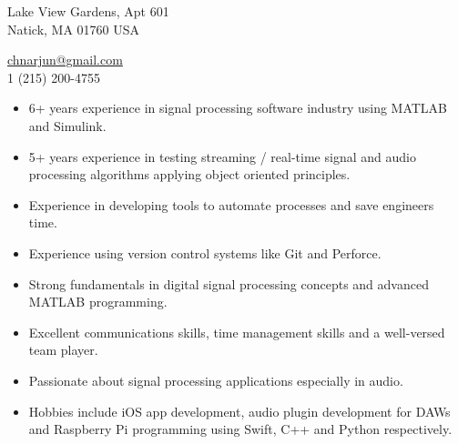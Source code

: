 \documentclass[12pt,a4paper]{article} %
\begin{document}
 


\begin{multicols}{2}

\begin{flushright}
 Lake View Gardens, Apt 601\\ Natick, MA 01760 USA %

\noindent\href{mailto:chnarjun@gmail.com}{chnarjun@gmail.com}\\%
\textsmaller{+}1 (215) 200-4755
\end{flushright}
\end{multicols}
\spacedhrule{0.9em}{-0.4em} %




\begin{itemize}
\item 6+ years experience in signal processing software industry using MATLAB and Simulink.
\noindent\item 5+ years experience in testing streaming / real-time signal and audio processing algorithms applying object oriented principles.
\noindent\item Experience in developing tools to automate processes and save engineers time.
\noindent\item Experience using version control systems like Git and Perforce.
\noindent\item Strong fundamentals in digital signal processing concepts and advanced MATLAB programming.
\noindent\item Excellent communications skills, time management skills and a well-versed team player.
\noindent\item Passionate about signal processing applications especially in audio.
\noindent\item Hobbies include iOS app development, audio plugin development for DAWs and Raspberry Pi programming using Swift, C++ and Python respectively.

\end{itemize}
\end{document}
